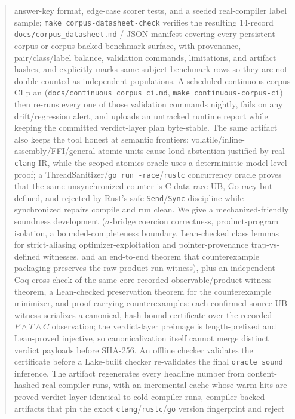 \documentclass[10pt,a4paper]{article}
\begin{document}
\begin{abstract}
answer-key format, edge-case scorer tests, and a seeded real-compiler label
sample; \texttt{make corpus-datasheet-check} verifies the resulting 14-record
\texttt{docs/corpus\_datasheet.md} / JSON manifest covering every persistent
corpus or corpus-backed benchmark surface, with provenance, pair/class/label
balance, validation commands, limitations, and artifact hashes, and explicitly
marks same-subject benchmark rows so they are not double-counted as independent
populations.  A scheduled continuous-corpus CI plan
(\texttt{docs/continuous\_corpus\_ci.md},
\texttt{make continuous-corpus-ci}) then re-runs every one of those validation
commands nightly, fails on any drift/regression alert, and uploads an untracked
runtime report while keeping the committed verdict-layer plan byte-stable. The
same artifact also keeps
the tool honest at semantic frontiers: volatile/inline-assembly/FFI/general
atomic units cause loud abstention justified by real \texttt{clang} IR, while
the scoped atomics oracle uses a deterministic model-level proof; a
ThreadSanitizer/\texttt{go run -race}/\texttt{rustc} concurrency oracle proves
that the same unsynchronized counter is C data-race UB, Go racy-but-defined, and
rejected by Rust's safe \texttt{Send}/\texttt{Sync} discipline while synchronized
repairs compile and run clean. We give a mechanized-friendly soundness development
($\sigma$-bridge coercion correctness, product-program isolation, a
bounded-completeness boundary, Lean-checked class lemmas for strict-aliasing
optimizer-exploitation and pointer-provenance trap-vs-defined witnesses, and an
end-to-end theorem that counterexample packaging preserves the raw product-run
witness), plus an independent Coq cross-check of the same core
recorded-observable/product-witness theorem, a Lean-checked preservation theorem
for the counterexample minimizer, and proof-carrying counterexamples:
each confirmed source-UB witness serializes a canonical, hash-bound certificate
over the recorded \(P\wedge T\wedge C\) observation; the verdict-layer preimage is
length-prefixed and Lean-proved injective, so canonicalization itself cannot merge
distinct verdict payloads before SHA-256.  An offline checker validates the
certificate before a Lake-built checker re-validates the final
\texttt{oracle\_sound} inference.  The artifact regenerates every headline number from content-hashed
real-compiler runs, with an incremental cache whose warm hits are proved
verdict-layer identical to cold compiler runs, compiler-backed artifacts that pin
the exact \texttt{clang}/\texttt{rustc}/\texttt{go} version fingerprint and reject

\end{abstract}
\end{document}
